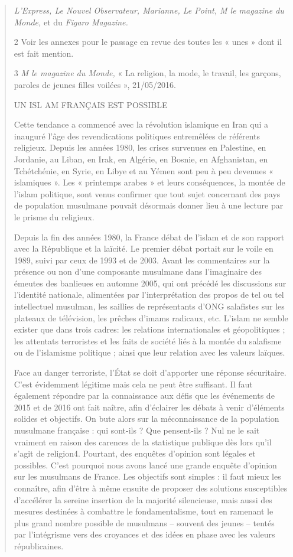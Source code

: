 \begin{quote}
\emph{L'Express, Le Nouvel Observateur, Marianne, Le Point, M le
magazine du Monde,} et du \emph{Figaro Magazine.}

2 Voir les annexes pour le passage en revue des toutes les « unes » dont
il est fait mention.

3 \emph{M le magazine du Monde,} « La religion, la mode, le travail, les
garçons, paroles de jeunes filles voilées », 21/05/2016.

UN ISL AM FRANÇAIS EST POSSIBLE

Cette tendance a commencé avec la révolution islamique en Iran qui a
inauguré l'âge des revendications politiques entremêlées de référents
religieux. Depuis les années 1980, les crises survenues en Palestine, en
Jordanie, au Liban, en Irak, en Algérie, en Bosnie, en Afghanistan, en
Tchétchénie, en Syrie, en Libye et au Yémen sont peu à peu devenues «
islamiques ». Les « printemps arabes » et leurs conséquences, la montée
de l'islam politique, sont venus confirmer que tout sujet concernant des
pays de population musulmane pouvait désormais donner lieu à une lecture
par le prisme du religieux.

Depuis la fin des années 1980, la France débat de l'islam et de son
rapport avec la République et la laïcité. Le premier débat portait sur
le voile en 1989, suivi par ceux de 1993 et de 2003. Avant les
commentaires sur la présence ou non d'une composante musulmane dans
l'imaginaire des émeutes des banlieues en automne 2005, qui ont précédé
les discussions sur l'identité nationale, alimentées par
l'interprétation des propos de tel ou tel intellectuel musulman, les
saillies de représentants d'ONG salafistes sur les plateaux de
télévision, les prêches d'imams radicaux, etc. L'islam ne semble exister
que dans trois cadres: les relations internationales et géopolitiques ;
les attentats terroristes et les faits de société liés à la montée du
salafisme ou de l'islamisme politique ; ainsi que leur relation avec les
valeurs laïques.

Face au danger terroriste, l'État se doit d'apporter une réponse
sécuritaire. C'est évidemment légitime mais cela ne peut être suffisant.
Il faut également répondre par la connaissance aux défis que les
événements de 2015 et de 2016 ont fait naître, afin d'éclairer les
débats à venir d'éléments solides et objectifs. On bute alors sur la
méconnaissance de la population musulmane française : qui sont-ils ? Que
pensent-ils ? Nul ne le sait vraiment en raison des carences de la
statistique publique dès lors qu'il s'agit de religion4. Pourtant, des
enquêtes d'opinion sont légales et possibles. C'est pourquoi nous avons
lancé une grande enquête d'opinion sur les musulmans de France. Les
objectifs sont simples : il faut mieux les connaître, afin d'être à même
ensuite de proposer des solutions susceptibles d'accélérer la sereine
insertion de la majorité silencieuse, mais aussi des mesures destinées à
combattre le fondamentalisme, tout en ramenant le plus grand nombre
possible de musulmans -- souvent des jeunes -- tentés par l'intégrisme
vers des croyances et des idées en phase avec les valeurs républicaines.


\end{quote}
